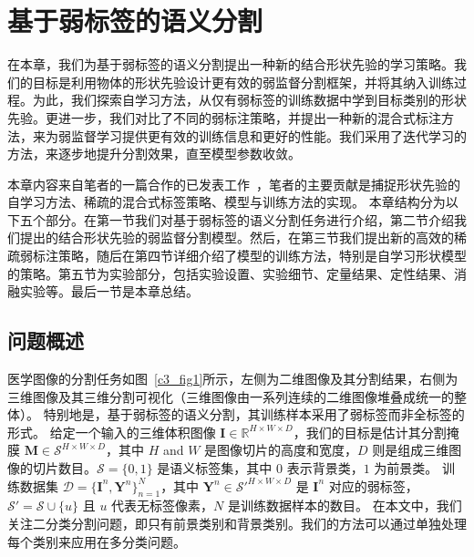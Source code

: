 \chapter{基于弱标签的语义分割}

在本章，我们为基于弱标签的语义分割提出一种新的结合形状先验的学习策略。我们的目标是利用物体的形状先验设计更有效的弱监督分割框架，并将其纳入训练过程。为此，我们探索自学习方法，从仅有弱标签的训练数据中学到目标类别的形状先验。更进一步，我们对比了不同的弱标注策略，并提出一种新的混合式标注方法，来为弱监督学习提供更有效的训练信息和更好的性能。我们采用了迭代学习的方法，来逐步地提升分割效果，直至模型参数收敛。

本章内容来自笔者的一篇合作的已发表工作~\cite{he2021weakly}，笔者的主要贡献是捕捉形状先验的自学习方法、稀疏的混合式标签策略、模型与训练方法的实现。
本章结构分为以下五个部分。在第一节我们对基于弱标签的语义分割任务进行介绍，第二节介绍我们提出的结合形状先验的弱监督分割模型。然后，在第三节我们提出新的高效的稀疏弱标注策略，随后在第四节详细介绍了模型的训练方法，特别是自学习形状模型的策略。第五节为实验部分，包括实验设置、实验细节、定量结果、定性结果、消融实验等。最后一节是本章总结。

\section{问题概述}
医学图像的分割任务如图~\ref{c3_fig1}所示，左侧为二维图像及其分割结果，右侧为三维图像及其三维分割可视化（三维图像由一系列连续的二维图像堆叠成统一的整体）。
特别地是，基于弱标签的语义分割，其训练样本采用了弱标签而非全标签的形式。
给定一个输入的三维体积图像 $\mathbf{I} \in \mathbb{R}^{H \times W \times D}$，我们的目标是估计其分割掩膜 $\mathbf{M} \in \mathcal{S}^{H \times W \times D}$，其中 $H$ and $W$ 是图像切片的高度和宽度，$D$ 则是组成三维图像的切片数目。$\mathcal{S} = \{0, 1\}$ 是语义标签集，其中 $0$ 表示背景类，$1$ 为前景类。
训练数据集 $\mathcal{D} = \{\mathbf{I}^n, \mathbf{Y}^n\}_{n=1}^N$，其中 $\mathbf{Y}^n \in \mathcal{S}'^{H \times W \times D}$ 是 $\mathbf{I}^n$ 对应的弱标签， $\mathcal{S}' = \mathcal{S} \cup \{u\}$ 且 $u$ 代表无标签像素，$N$ 是训练数据样本的数目。
在本文中，我们关注二分类分割问题，即只有前景类别和背景类别。我们的方法可以通过单独处理每个类别来应用在多分类问题。

